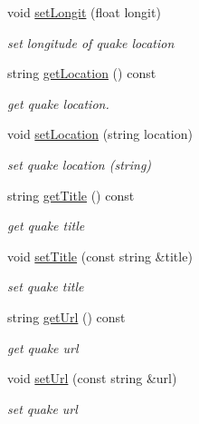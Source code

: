 \begin{DoxyCompactItemize}
void \hyperlink{classbridges_1_1dataset_1_1_earthquake_u_s_g_s_a80ceea5c1ae15e7fd075ded145a14779}{set\+Longit} (float longit)
\begin{DoxyCompactList}\small\item\em set longitude of quake location \end{DoxyCompactList}\item 
string \hyperlink{classbridges_1_1dataset_1_1_earthquake_u_s_g_s_a56f3fede61e32b4bc35874435c59fc0e}{get\+Location} () const
\begin{DoxyCompactList}\small\item\em get quake location. \end{DoxyCompactList}\item 
void \hyperlink{classbridges_1_1dataset_1_1_earthquake_u_s_g_s_a88ad0700837cc78896eed2033e53d9a0}{set\+Location} (string location)
\begin{DoxyCompactList}\small\item\em set quake location (string) \end{DoxyCompactList}\item 
string \hyperlink{classbridges_1_1dataset_1_1_earthquake_u_s_g_s_a3e63533e53a119ceeb98c97ff35abc4a}{get\+Title} () const
\begin{DoxyCompactList}\small\item\em get quake title \end{DoxyCompactList}\item 
void \hyperlink{classbridges_1_1dataset_1_1_earthquake_u_s_g_s_a8a479d05e3f3896d4eeaad1bcccf9f02}{set\+Title} (const string \&title)
\begin{DoxyCompactList}\small\item\em set quake title \end{DoxyCompactList}\item 
string \hyperlink{classbridges_1_1dataset_1_1_earthquake_u_s_g_s_ab009982ed697df7ea2c913eb2b7e88be}{get\+Url} () const
\begin{DoxyCompactList}\small\item\em get quake url \end{DoxyCompactList}\item 
void \hyperlink{classbridges_1_1dataset_1_1_earthquake_u_s_g_s_aecb3cb7e4dba2315fed2a4a316a1fac9}{set\+Url} (const string \&url)
\begin{DoxyCompactList}\small\item\em set quake url \end{DoxyCompactList}\item 

\end{DoxyCompactItemize}
